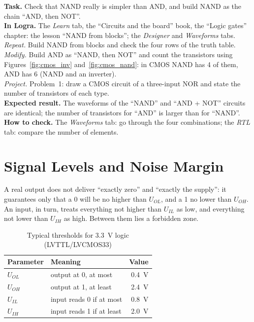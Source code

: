 \begin{diybox}
\textbf{Task.} Check that NAND really is simpler than AND, and build NAND
as the chain ``AND, then NOT''.\\
\textbf{In Logra.} The \emph{Learn} tab, the ``Circuits and the board'' book, the ``Logic
gates'' chapter: the lesson ``NAND from blocks''; the \emph{Designer} and
\emph{Waveforms} tabs.\\
 \emph{Repeat.} Build NAND from blocks and check the four rows of the
truth table.\\
 \emph{Modify.} Build AND as ``NAND, then NOT'' and count the
transistors using Figures~\ref{fig:cmos_inv} and~\ref{fig:cmos_nand}: in CMOS
NAND has 4 of them, AND has 6 (NAND and an inverter).\\
 \emph{Project.} Problem~1: draw a CMOS circuit of a three-input NOR and
state the number of transistors of each type.\\
\textbf{Expected result.} The waveforms of the ``NAND'' and ``AND + NOT'' circuits are identical;
the number of transistors for ``AND'' is larger than for ``NAND''.\\
\textbf{How to check.} The \emph{Waveforms} tab: go through the four combinations;
the \emph{RTL} tab: compare the number of elements.
\end{diybox}

\section{Signal Levels and Noise Margin}

A real output does not deliver ``exactly zero'' and ``exactly the supply'': it
guarantees only that a 0 will be no higher than $U_{OL}$, and a 1 no lower than
$U_{OH}$. An input, in turn, treats everything not higher than $U_{IL}$ as low, and
everything not lower than $U_{IH}$ as high. Between them lies a forbidden zone.

\begin{table}[H]
\centering
\caption{Typical thresholds for 3.3~V logic (LVTTL/LVCMOS33)}
\small
\begin{tabular}{llr}
\toprule
\textbf{Parameter} & \textbf{Meaning} & \textbf{Value} \\
\midrule
$U_{OL}$ & output at 0, at most & 0.4~V \\
$U_{OH}$ & output at 1, at least & 2.4~V \\
$U_{IL}$ & input reads 0 if at most & 0.8~V \\
$U_{IH}$ & input reads 1 if at least & 2.0~V \\
\bottomrule
\end{tabular}
\end{table}

